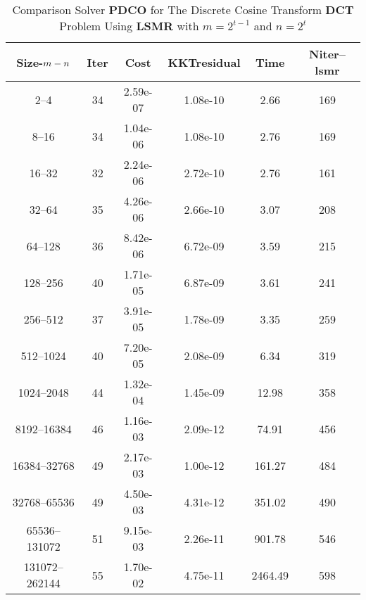 \documentclass[letterpaper,12pt,oneside,final]{book}
\begin{document}
\begin{table}
\caption{Comparison Solver  {\bf PDCO}  for  The Discrete Cosine Transform {\bf DCT} Problem Using {\bf LSMR} with $m=2^{t-1}$ and $n=2^{t}$} 
\begin{center}
\begin{tabular}{|*{6}{c}|} \hline
Size-$m\--n$& \multicolumn{1}{c}{Iter} & \multicolumn{1}{c}{Cost} & \multicolumn{1}{c}{KKTresidual} & \multicolumn{1}{c}{Time} & \multicolumn{1}{c|}{Niter--lsmr} \\
\hline
2--4 &34& 2.59e-07& 1.08e-10& 2.66& 169 \\ 
8--16 &34& 1.04e-06& 1.08e-10& 2.76& 169 \\ 
16--32 &32& 2.24e-06& 2.72e-10& 2.76& 161 \\  
32--64 &35& 4.26e-06& 2.66e-10& 3.07& 208 \\ 
64--128 &36& 8.42e-06& 6.72e-09& 3.59& 215 \\ 
128--256 &40& 1.71e-05& 6.87e-09& 3.61& 241 \\ 
256--512 &37& 3.91e-05& 1.78e-09& 3.35& 259 \\ 
512--1024 &40& 7.20e-05& 2.08e-09& 6.34& 319 \\ 
1024--2048 &44& 1.32e-04& 1.45e-09& 12.98& 358 \\ 
8192--16384 &46& 1.16e-03& 2.09e-12& 74.91& 456 \\ 
16384--32768 &49& 2.17e-03& 1.00e-12& 161.27& 484 \\ 
32768--65536 &49& 4.50e-03& 4.31e-12& 351.02& 490 \\ 
65536--131072 &51& 9.15e-03& 2.26e-11& 901.78& 546 \\ 
131072--262144 &55& 1.70e-02& 4.75e-11& 2464.49& 598 \\
\hline
\end{tabular}
\end{center}
\end{table}
\end{document}
